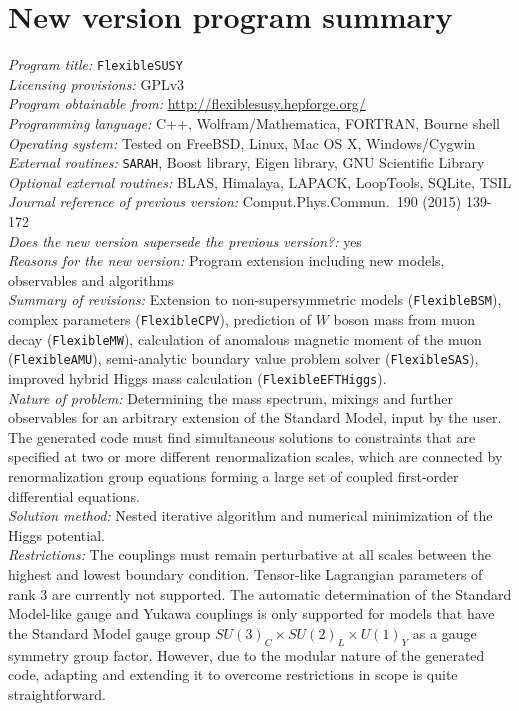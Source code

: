 \documentclass[final,3p,11pt,pdflatex]{elsarticle}
\makeatletter
\newcommand{\sarah}{\texttt{SARAH}\@\xspace}
\newcommand{\fs}{\texttt{FlexibleSUSY}\@\xspace}
\newcommand{\fbsm}{\texttt{FlexibleBSM}\@\xspace}
\newcommand{\fcpv}{\texttt{FlexibleCPV}\@\xspace}
\newcommand{\fmw}{\texttt{FlexibleMW}\@\xspace}
\newcommand{\famu}{\texttt{FlexibleAMU}\@\xspace}
\newcommand{\fsas}{\texttt{FlexibleSAS}\@\xspace}
\newcommand{\feft}{\texttt{Flex\-ib\-le\-EFT\-Higgs}\@\xspace}
\makeatother
\begin{document}
\clearpage
{}
\section*{New version program summary}
\noindent
{\em Program title:} \fs\\[0.5em]
{\em Licensing provisions:} GPLv3\\[0.5em]
{\em Program obtainable from:} \url{http://flexiblesusy.hepforge.org/}\\[0.5em]
{\em Programming language:} C++, Wolfram/Mathematica, FORTRAN, Bourne shell\\[0.5em]
{\em Operating system:} Tested on FreeBSD, Linux, Mac OS X, Windows/Cygwin\\[0.5em]
{\em External routines:} \sarah, Boost library, Eigen library, GNU Scientific Library\\[0.5em]
{\em Optional external routines:} BLAS, Himalaya, LAPACK, LoopTools, SQLite, TSIL\\[0.5em]
{\em Journal reference of previous version:} Comput.Phys.Commun.\ 190 (2015) 139-172\\[0.5em]
{\em Does the new version supersede the previous version?:} yes \\[0.5em]
{\em Reasons for the new version:} Program extension including new models, observables and algorithms\\[0.5em]
{\em Summary of revisions:} Extension to non-supersymmetric models
(\fbsm), complex parameters (\fcpv), prediction of $W$ boson mass from
muon decay (\fmw), calculation of anomalous magnetic moment of the
muon (\famu), semi-analytic boundary value problem solver (\fsas),
improved hybrid Higgs mass calculation (\feft).\\[0.5em]
{\em Nature of problem:}
%
Determining the mass spectrum, mixings and further observables for an arbitrary extension
of the Standard Model, input by the user. The generated code must find
simultaneous solutions to constraints that are specified at two or
more different renormalization scales, which are connected by
renormalization group equations forming a large set of coupled
first-order differential
equations. \\[0.5em]
%
{\em Solution method:}
%
Nested iterative algorithm and numerical
minimization of the Higgs potential.\\[0.5em]
%
{\em Restrictions:}
%
The couplings must remain perturbative at all scales between the
highest and lowest boundary condition.  Tensor-like Lagrangian
parameters of rank 3 are currently not supported.  The automatic
determination of the Standard Model-like gauge and Yukawa couplings is
only supported for models that have the Standard Model gauge group
$SU(3)_C\times SU(2)_L\times U(1)_Y$ as a gauge symmetry group factor.
However, due to the modular nature of the generated code, adapting and
extending it to overcome restrictions in scope is quite straightforward.
\end{document}
